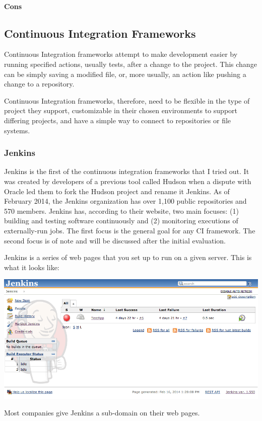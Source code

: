 \documentclass[11pt]{article}
\newenvironment{Figure}
  {\par\medskip\noindent\minipage{\linewidth}}
  {\endminipage\par\medskip}
\begin{document}
\paragraph{Cons}

\subsection{Continuous Integration Frameworks}
Continuous Integration frameworks attempt to make development easier by running specified actions, usually tests, after a change to the project. This change can be simply saving a modified file, or, more usually, an action like pushing a change to a repository.

Continuous Integration frameworks, therefore, need to be flexible in the type of project they support, customizable in their chosen environments to support differing projects, and have a simple way to connect to repositories or file systems.

\subsubsection{Jenkins \cite{Jenkins}}
Jenkins is the first of the continuous integration frameworks that I tried out. It was created by developers of a previous tool called Hudson when a dispute with Oracle led them to fork the Hudson project and rename it Jenkins. As of February 2014, the Jenkins organization has over 1,100 public repositories and 570 members. \cite{JenkinsGitHub} Jenkins has, according to their website, two main focuses: (1) building and testing software continuously and (2) monitoring executions of externally-run jobs. The first focus is the general goal for any CI framework. The second focus is of note and will be discussed after the initial evaluation. 

Jenkins is a series of web pages that you set up to run on a given server. This is what it looks like:
\begin{Figure}
  \centering
  \includegraphics[width=0.95\linewidth]{jenkins.png}
\end{Figure}
Most companies give Jenkins a sub-domain on their web pages.
\end{document}

